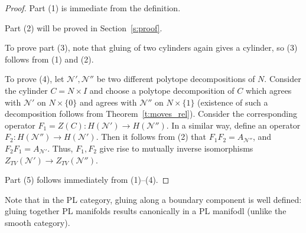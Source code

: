 \documentclass{amsart}
\theoremstyle{definition}
\theoremstyle{remark}
\numberwithin{equation}{section}
\newcommand{\thref}[1]{Theorem~{\rm\ref{#1}}}
\newcommand{\seref}[1]{Section~{\rm\ref{#1}}}
\newcommand{\<}{\langle}
\renewcommand{\>}{\rangle}
\newcommand{\N}{\mathcal{N}}       %
\begin{document}
\begin{proof}
   Part (1) is immediate from the definition. 

   Part (2) will be proved in \seref{s:proof}.

    To prove part (3), note that
    gluing of two cylinders again gives a cylinder, so (3) follows from
    (1) and (2). 
  
  To prove (4), let $\N', \N''$ be two different polytope decompositions of
  $N$. Consider the cylinder $C=N\times I$ and choose a polytope
    decomposition of $C$ which agrees with $\N'$ on $N\times\{0\}$ and
    agrees with $\N''$ on $N\times\{1\}$ (existence of such a
      decomposition follows from \thref{t:moves_rel}).  Consider the
    corresponding operator 
    $F_1=Z(C)\colon  H(\N')\to H(\N'')$. In a similar way, define an
    operator $F_2\colon 
    H(\N'')\to H(\N')$. Then it follows from (2) that $F_1F_2=A_{\N''}$,
    and $F_2F_1=A_{\N'}$. Thus, $F_1, F_2$ give rise to mutually
    inverse isomorphisms $Z_{TV}(\N')\to Z_{TV}(\N'')$. 
    
    
   Part (5) follows immediately from (1)--(4).
    
\end{proof}

Note that in the PL category, gluing along a boundary component is well
defined: gluing together PL manifolds results canonically in a PL
manifodl (unlike the smooth category). 
\end{document}
